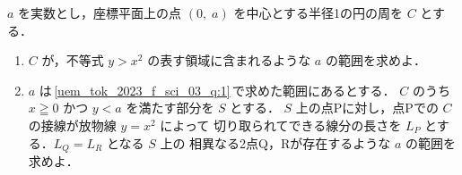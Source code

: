 ﻿\documentclass[../../../uem_tok_q.tex]{subfiles}
\begin{document}
    $a$ を実数とし，座標平面上の点 $(0,\;a)$ を中心とする半径1の円の周を $C$ とする．

    \begin{enumerate}
        \item $C$ が，不等式 $y>x^2$ の表す領域に含まれるような $a$ の範囲を求めよ．
            \label{uem_tok_2023_f_sci_03_q:1}
        \item $a$ は\,\ref{uem_tok_2023_f_sci_03_q:1}\,で求めた範囲にあるとする．%
            $C$ のうち $x\geqq 0$ かつ $y<a$ を満たす部分を $S$ とする．%
            $S$ 上の点Pに対し，点Pでの $C$ の接線が放物線 $y=x^2$ によって%
            切り取られてできる線分の長さを $L_P$ とする．$L_Q=L_R$ となる $S$ 上の%
            相異なる2点Q，Rが存在するような $a$ の範囲を求めよ．
    \end{enumerate}
\end{document}
